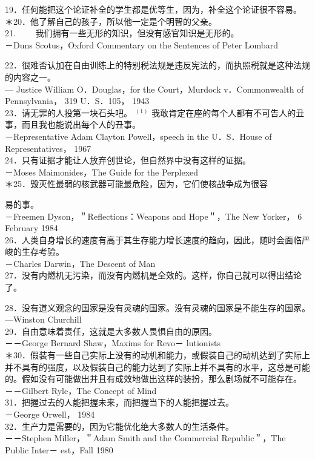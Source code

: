 19．任何能把这个论证补全的学生都是优等生，因为，补全这个论证很不容易。\\
＊20．他了解自己的孩子，所以他一定是个明智的父亲。\\
21. $\qquad$我们拥有一些无形的知识，但没有感官知识是无形的。\\
－Duns Scotus，Oxford Commentary on the Sentences of Peter Lombard

22．很难否认加在自由训练上的特别税法规是违反宪法的，而执照税就是这种法规的内容之一。\\
— Justice William O．Douglas，for the Court，Murdock v．Commonwealth of Pennsylvania， 319 U．S．105， 1943\\
23．请无罪的人投第一块石头吧。 ${ }^{(1)}$ 我敢肯定在座的每个人都有不可告人的丑事，而且我也能说出每个人的丑事。\\
－Representative Adam Clayton Powell，speech in the U．S．House of Representatives， 1967\\
24．只有证据才能让人放弃创世论，但自然界中没有这样的证据。\\
－Moses Maimonides，The Guide for the Perplexed\\
＊25．毁灭性最弱的核武器可能最危险，因为，它们使核战争成为很容

易的事。\\
－Freemen Dyson，＂Reflections：Weapons and Hope＂，The New Yorker， 6 February 1984\\
26．人类自身增长的速度有高于其生存能力增长速度的趋向，因此，随时会面临严峻的生存考验。\\
－Charles Darwin，The Descent of Man\\
27．没有内燃机无污染，而没有内燃机是全效的。这样，你自己就可以得出结论了。

28．没有道义观念的国家是没有灵魂的国家。没有灵魂的国家是不能生存的国家。\\
—Winston Churchill\\
29．自由意味着责任，这就是大多数人畏惧自由的原因。\\
－－George Bernard Shaw，Maxims for Revo－ lutionists\\
＊30．假装有一些自己实际上没有的动机和能力，或假装自己的动机达到了实际上并不具有的强度，以及假装自己的能力达到了实际上并不具有的水平，这总是可能的。假如没有可能做出并且有成效地做出这样的装扮，那么剧场就不可能存在。\\
－－Gilbert Ryle，The Concept of Mind\\
31．把握过去的人能把握未来，而把握当下的人能把握过去。\\
－George Orwell， 1984\\
32．生产力是需要的，因为它能优化绝大多数人的生活条件。\\
－－Stephen Miller，＂Adam Smith and the Commercial Republic＂，The Public Inter－ est，Fall 1980

